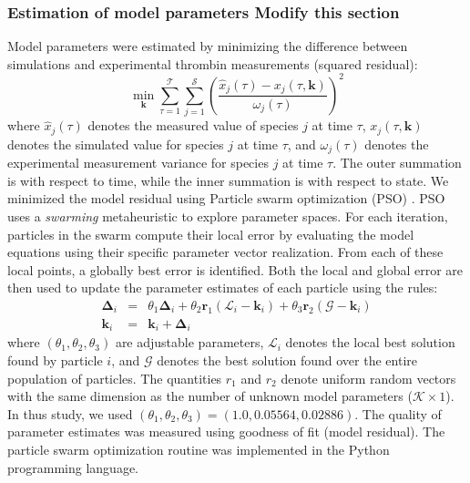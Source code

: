 \documentclass[10pt,twocolumn,twoside,final]{IEEEtran}
\begin{document}
\subsubsection*{Estimation of model parameters Modify this section}
Model parameters were estimated by minimizing the difference between simulations and experimental thrombin measurements (squared residual):
\begin{equation}\label{eqn:objective-function}
	\min_{\mathbf{k}} \sum_{\tau=1}^{\mathcal{T}}\sum_{j=1}^{\mathcal{S}}\left(\frac{\hat{x}_{j}\left(\tau\right) - x_{j}\left(\tau,\mathbf{k}\right)}{\omega_{j}\left(\tau\right)}\right)^{2}
\end{equation}where $\hat{x}_{j}\left(\tau\right)$ denotes the measured value of species $j$ at time $\tau$, $x_{j}\left(\tau,\mathbf{k}\right)$ denotes the simulated
value for species $j$ at time $\tau$, and $\omega_{j}\left(\tau\right)$ denotes the experimental measurement variance for species $j$ at time $\tau$.
The outer summation is with respect to time, while the inner summation is with respect to state. We minimized the model residual using Particle swarm optimization (PSO) \cite{PSO}. PSO uses a \textit{swarming} metaheuristic to explore parameter spaces.
For each iteration, particles in the swarm compute their local error by evaluating the model equations using their specific parameter vector realization.
From each of these local points, a globally best error is identified. Both the local and global error
are then used to update the parameter estimates of each particle using the rules:
\begin{eqnarray}
	\mathbf{\Delta}_{i} &=&\theta_{1}\mathbf{\Delta}_{i} + \theta_{2}\mathbf{r}_{1}\left(\mathcal{L}_{i} - \mathbf{k}_{i}\right) + \theta_{3}\mathbf{r}_{2}\left(\mathcal{G} - \mathbf{k}_{i}\right) \\
	\mathbf{k}_{i} &=& \mathbf{k}_{i} + \mathbf{\Delta}_{i}
\end{eqnarray}where $\left(\theta_{1},\theta_{2},\theta_{3}\right)$ are adjustable parameters, $\mathcal{L}_{i}$ denotes the local best solution found by particle $i$, and
$\mathcal{G}$ denotes the best solution found over the entire population of particles. The quantities $r_{1}$ and $r_{2}$ denote uniform random vectors with the same dimension as the number of unknown model
parameters ($\mathcal{K}\times{1}$). In thus study, we used $\left(\theta_{1},\theta_{2},\theta_{3}\right) = \left(1.0, 0.05564, 0.02886\right)$. The quality of parameter
estimates was measured using goodness of fit (model residual). The particle swarm optimization routine was implemented in the Python programming language.


\end{document}
